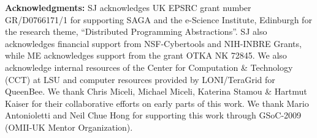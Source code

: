 \documentclass[3p,twocolumn]{elsarticle}
\begin{document}





\footnotesize{ {\noindent \bf Acknowledgments: }SJ acknowledges UK EPSRC grant
  number GR/D0766171/1 for supporting SAGA and the e-Science
  Institute, Edinburgh for the research theme, ``Distributed
  Programming Abstractions''.  SJ also acknowledges financial support
  from NSF-Cybertools and NIH-INBRE Grants, while ME acknowledges support
  from the grant OTKA NK 72845.  We also acknowledge
  internal resources of the Center for Computation \& Technology (CCT)
  at LSU and computer resources provided by LONI/TeraGrid for
  QueenBee.  We thank Chris Miceli, Michael Miceli, Katerina Stamou \&
  Hartmut Kaiser for their collaborative efforts on early parts of
  this work. We thank Mario Antonioletti and Neil Chue Hong for
  supporting this work through GSoC-2009 (OMII-UK Mentor
  Organization).}



\end{document}
